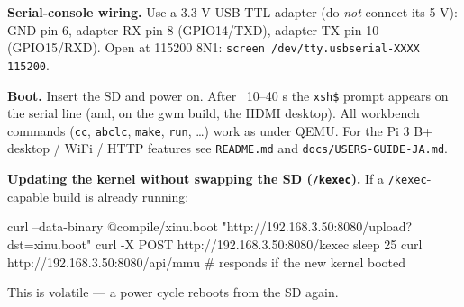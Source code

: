 \documentclass[a4paper,11pt]{article}
\begin{document}
\textbf{Serial-console wiring.} Use a 3.3 V USB-TTL adapter (do \emph{not}
connect its 5 V): GND \textrightarrow{} pin 6, adapter RX \textrightarrow{}
pin 8 (GPIO14/TXD), adapter TX \textrightarrow{} pin 10 (GPIO15/RXD). Open at
115200 8N1: \verb|screen /dev/tty.usbserial-XXXX 115200|.

\textbf{Boot.} Insert the SD and power on. After ~10--40 s the \verb|xsh$| prompt
appears on the serial line (and, on the gwm build, the HDMI desktop). All
workbench commands (\verb|cc|, \verb|abclc|, \verb|make|, \verb|run|, \dots) work
as under QEMU. For the Pi 3 B+ desktop / WiFi / HTTP features see \verb|README.md|
and \verb|docs/USERS-GUIDE-JA.md|.

\textbf{Updating the kernel without swapping the SD (\texttt{/kexec}).} If a
\verb|/kexec|-capable build is already running:
\begin{code}
curl --data-binary @compile/xinu.boot "http://192.168.3.50:8080/upload?dst=xinu.boot"
curl -X POST http://192.168.3.50:8080/kexec
sleep 25
curl http://192.168.3.50:8080/api/mmu     # responds if the new kernel booted
\end{code}
This is volatile --- a power cycle reboots from the SD again.
\end{document}
